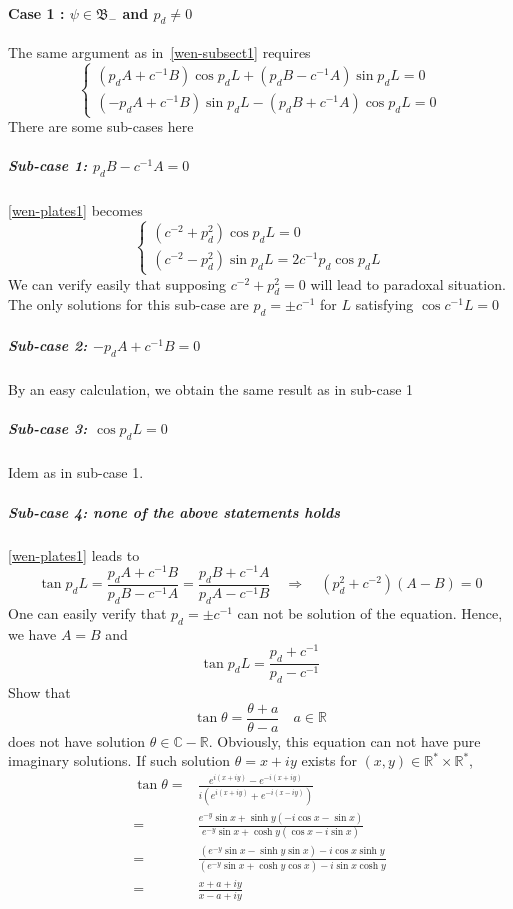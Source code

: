 \paragraph{Case 1 : $\psi \in \mathfrak{B}_-$ and $p_d \neq 0$}
The same argument as in~\cref{wen-subsect1} requires
\begin{equation}\label{wen-plates1}
\begin{cases}
(p_d A + c^{-1} B) \cos p_d L + (p_d B - c^{-1} A)\sin p_d L = 0 \\
(- p_d A + c^{-1}B)\sin p_d L - (p_d B + c^{-1} A)\cos p_d L = 0
\end{cases}
\end{equation}
There are some sub-cases here
\subparagraph{Sub-case 1: $ p_d B - c^{-1}A = 0$}
\cref{wen-plates1} becomes
\begin{equation*}
\begin{cases}
(c^{-2} + p_d ^2)\cos p_d L = 0 \\
(c^{-2} - p_d^2)\sin p_d L = 2 c^{-1}p_d \cos p_d L
\end{cases}
\end{equation*}
We can verify easily that supposing $ c^{-2} + p_d^2 = 0 $ will lead to paradoxal situation. The only solutions for this sub-case are $p_d = \pm c^{-1}$ for $L$ satisfying $\cos c^{-1} L = 0$
%
\subparagraph{Sub-case 2: $ -p_d A + c^{-1}B = 0$}
By an easy calculation, we obtain the same result as in sub-case 1
%
\subparagraph{Sub-case 3: $\cos p_d L = 0 $}
Idem as in sub-case 1.
%
\subparagraph{Sub-case 4: none of the above statements holds}
\cref{wen-plates1} leads to
\begin{equation*}
\tan p_d L = \frac{p_d A + c^{-1} B }{p_d B - c^{-1} A} = 
\frac{p_d B + c^{-1}A}{p_d A- c^{-1} B}
\quad\Rightarrow\quad
(p_d ^2 + c^{-2})(A - B )= 0
\end{equation*}
One can easily verify that $p_d = \pm c^{-1}$ can not be solution of the equation. 
Hence, we have $A = B$ and
\begin{equation}\label{wen-tan}
\tan p_d L = \frac{p_d +c^{-1}}{p_d - c^{-1}}
\end{equation}
Show that
\begin{equation*}
\tan \theta = \frac{\theta + a}{\theta - a} \quad a\in \mathbb{R} 
\end{equation*}
does not have solution $\theta \in \mathbb{C} - \mathbb{R}$.
Obviously, this equation can not have pure imaginary solutions.
If such solution $\theta = x + i y$ exists for $(x, y) \in\mathbb{R}^*\times\mathbb{R}^*$,
\begin{equation*}
\begin{split}
\tan \theta = & \frac{e^{i(x+iy)} - e^{-i(x+iy)}}{i(e^{i(x+iy)}+ e^{-i(x-iy)})} \\
= & \frac{e^{-y}\sin x + \sinh y (-i\cos x - \sin x)}{e^{-y}\sin x + \cosh y (\cos x - i\sin x)} \\
= & \frac{(e^{-y}\sin x - \sinh y \sin x )- i\cos x \sinh y}{(e^{-y} \sin x +\cosh y \cos x) - i \sin x \cosh y} \\
=& \frac{x+a+ iy}{x -a +iy}
\end{split}
\end{equation*}

